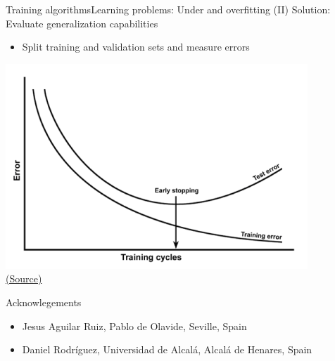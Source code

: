 \documentclass[10pt,compress]{beamer} %
\begin{document}
\begin{frame}{Training algorithms}{Learning problems: Under and overfitting (II)}
       Solution: Evaluate generalization capabilities
            \begin{itemize}
                \item Split training and validation sets and measure errors
            \end{itemize}

            \begin{center}
			\includegraphics[width=0.6\linewidth]{figs/validation.png}\\
			\scriptsize \href{https://datascience.stackexchange.com/questions/61/why-is-overfitting-bad-in-machine-learning}{(Source)}
            \end{center}
\end{frame}

\begin{frame}{Acknowlegements}
	\begin{itemize}
		\item Jesus Aguilar Ruiz, Pablo de Olavide, Seville, Spain
		\item Daniel Rodr\'iguez, Universidad de Alcal\'a, Alcal\'a de Henares, Spain
	\end{itemize}
\end{frame}
\end{document}
